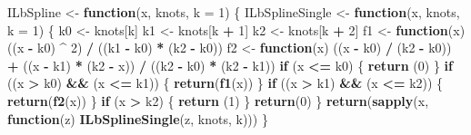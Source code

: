 \documentclass[
  12pt,
]{article}
\newenvironment{Shaded}{\begin{snugshade}}{\end{snugshade}}
\newcommand{\ControlFlowTok}[1]{\textcolor[rgb]{0.13,0.29,0.53}{\textbf{#1}}}
\newcommand{\DataTypeTok}[1]{\textcolor[rgb]{0.13,0.29,0.53}{#1}}
\newcommand{\DecValTok}[1]{\textcolor[rgb]{0.00,0.00,0.81}{#1}}
\newcommand{\KeywordTok}[1]{\textcolor[rgb]{0.13,0.29,0.53}{\textbf{#1}}}
\newcommand{\NormalTok}[1]{#1}
\newcommand{\OperatorTok}[1]{\textcolor[rgb]{0.81,0.36,0.00}{\textbf{#1}}}
\newcommand{\StringTok}[1]{\textcolor[rgb]{0.31,0.60,0.02}{#1}}
\begin{document}
\begin{Shaded}
\begin{Highlighting}[]
\NormalTok{ILbSpline \textless{}{-}}\StringTok{ }\ControlFlowTok{function}\NormalTok{(x, knots, }\DataTypeTok{k =} \DecValTok{1}\NormalTok{) \{}
\NormalTok{  ILbSplineSingle \textless{}{-}}\StringTok{ }\ControlFlowTok{function}\NormalTok{(x, knots, }\DataTypeTok{k =} \DecValTok{1}\NormalTok{) \{}
\NormalTok{    k0 \textless{}{-}}\StringTok{ }\NormalTok{knots[k]}
\NormalTok{    k1 \textless{}{-}}\StringTok{ }\NormalTok{knots[k }\OperatorTok{+}\StringTok{ }\DecValTok{1}\NormalTok{]}
\NormalTok{    k2 \textless{}{-}}\StringTok{ }\NormalTok{knots[k }\OperatorTok{+}\StringTok{ }\DecValTok{2}\NormalTok{]}
\NormalTok{    f1 \textless{}{-}}\StringTok{ }\ControlFlowTok{function}\NormalTok{(x)}
\NormalTok{      ((x }\OperatorTok{{-}}\StringTok{ }\NormalTok{k0) }\OperatorTok{\^{}}\StringTok{ }\DecValTok{2}\NormalTok{) }\OperatorTok{/}\StringTok{ }\NormalTok{((k1 }\OperatorTok{{-}}\StringTok{ }\NormalTok{k0) }\OperatorTok{*}\StringTok{ }\NormalTok{(k2 }\OperatorTok{{-}}\StringTok{ }\NormalTok{k0))}
\NormalTok{    f2 \textless{}{-}}
\StringTok{      }\ControlFlowTok{function}\NormalTok{(x)}
\NormalTok{        ((x }\OperatorTok{{-}}\StringTok{ }\NormalTok{k0) }\OperatorTok{/}\StringTok{ }\NormalTok{(k2 }\OperatorTok{{-}}\StringTok{ }\NormalTok{k0)) }\OperatorTok{+}\StringTok{ }\NormalTok{((x }\OperatorTok{{-}}\StringTok{ }\NormalTok{k1) }\OperatorTok{*}\StringTok{ }\NormalTok{(k2 }\OperatorTok{{-}}\StringTok{ }\NormalTok{x)) }\OperatorTok{/}\StringTok{ }\NormalTok{((k2 }\OperatorTok{{-}}\StringTok{ }\NormalTok{k0) }\OperatorTok{*}\StringTok{ }\NormalTok{(k2 }\OperatorTok{{-}}\StringTok{ }\NormalTok{k1))}
    \ControlFlowTok{if}\NormalTok{ (x }\OperatorTok{\textless{}=}\StringTok{ }\NormalTok{k0) \{}
      \KeywordTok{return}\NormalTok{ (}\DecValTok{0}\NormalTok{)}
\NormalTok{    \}}
    \ControlFlowTok{if}\NormalTok{ ((x }\OperatorTok{\textgreater{}}\StringTok{ }\NormalTok{k0) }\OperatorTok{\&\&}\StringTok{ }\NormalTok{(x }\OperatorTok{\textless{}=}\StringTok{ }\NormalTok{k1)) \{}
      \KeywordTok{return}\NormalTok{(}\KeywordTok{f1}\NormalTok{(x))}
\NormalTok{    \}}
    \ControlFlowTok{if}\NormalTok{ ((x }\OperatorTok{\textgreater{}}\StringTok{ }\NormalTok{k1) }\OperatorTok{\&\&}\StringTok{ }\NormalTok{(x }\OperatorTok{\textless{}=}\StringTok{ }\NormalTok{k2)) \{}
      \KeywordTok{return}\NormalTok{(}\KeywordTok{f2}\NormalTok{(x))}
\NormalTok{    \}}
    \ControlFlowTok{if}\NormalTok{ (x }\OperatorTok{\textgreater{}}\StringTok{ }\NormalTok{k2) \{}
      \KeywordTok{return}\NormalTok{ (}\DecValTok{1}\NormalTok{)}
\NormalTok{    \}}
    \KeywordTok{return}\NormalTok{(}\DecValTok{0}\NormalTok{)}
\NormalTok{  \}}
  \KeywordTok{return}\NormalTok{(}\KeywordTok{sapply}\NormalTok{(x, }\ControlFlowTok{function}\NormalTok{(z)}
    \KeywordTok{ILbSplineSingle}\NormalTok{(z, knots, k)))}
\NormalTok{\}}
\end{Highlighting}
\end{Shaded}
\end{document}
